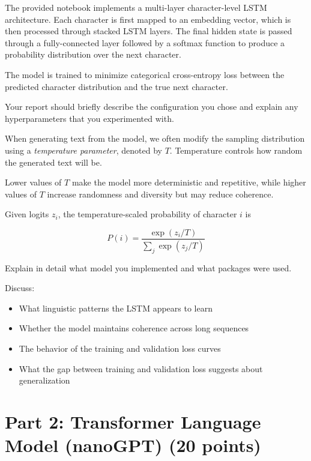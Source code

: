 The provided notebook implements a multi-layer character-level LSTM
architecture. Each character is first mapped to an embedding vector, which
is then processed through stacked LSTM layers. The final hidden state is
passed through a fully-connected layer followed by a softmax function to
produce a probability distribution over the next character.

The model is trained to minimize categorical cross-entropy loss between the
predicted character distribution and the true next character.

Your report should briefly describe the configuration you chose and explain
any hyperparameters that you experimented with.

When generating text from the model, we often modify the sampling distribution
using a \emph{temperature parameter}, denoted by $T$. Temperature controls how
random the generated text will be.

Lower values of $T$ make the model more deterministic and repetitive, while
higher values of $T$ increase randomness and diversity but may reduce
coherence.
\pagebreak

Given logits $z_i$, the temperature-scaled probability of character $i$ is

\[
P(i) = \frac{\exp(z_i/T)}{\sum_j \exp(z_j/T)}
\]

\begin{solution}

Explain in detail what model you implemented and what packages were used.

Discuss:

\begin{itemize}

\item What linguistic patterns the LSTM appears to learn
\item Whether the model maintains coherence across long sequences
\item The behavior of the training and validation loss curves
\item What the gap between training and validation loss suggests about generalization

\end{itemize}

\end{solution}

\section{Part 2: Transformer Language Model (nanoGPT) (20 points)}

